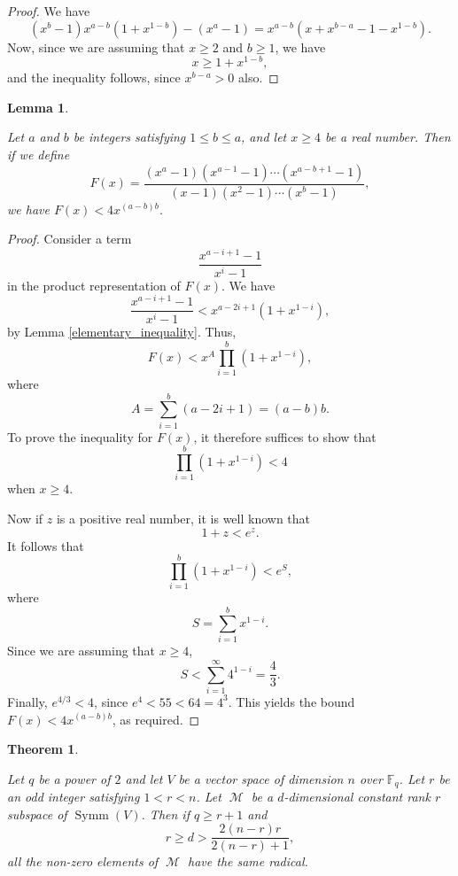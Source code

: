 \documentclass{amsart}
\DeclareMathOperator{\M}{\mathcal{M}}
\DeclareMathOperator{\Symm}{Symm}
\theoremstyle{plain}
\newtheorem{theorem}{Theorem}
\newtheorem{lemma}{Lemma}
\theoremstyle{definition}
\begin{document}
\begin{proof}
 
 We have
 \[
  (x^b-1)x^{a-b}(1+x^{1-b})-(x^a-1)=x^{a-b}(x+x^{b-a}-1-x^{1-b}).
 \]
 Now, since we are assuming that $x\geq 2$ and $b\geq 1$, we have
 \[
  x\geq 1+x^{1-b},
 \]
and the inequality follows, since $x^{b-a}>0$ also.

\end{proof}

\begin{lemma} \label{advanced_inequality}
 
 Let $a$ and $b$ be integers satisfying $1\leq b\leq a$, and let $x\geq 4$ be a real number. Then if we define
 \[
  F(x)=\frac{(x^a-1)(x^{a-1}-1)\cdots (x^{a-b+1}-1)}{(x-1)(x^2-1)\cdots (x^b-1)},
 \]
we have $F(x)<4x^{(a-b)b}$.
 
\end{lemma}

\begin{proof}
 Consider a term
 \[
  \frac{x^{a-i+1}-1}{x^i-1}
 \]
 in the product representation of $F(x)$. We have
 \[
  \frac{x^{a-i+1}-1}{x^i-1}<x^{a-2i+1}(1+x^{1-i}),
 \]
by Lemma \ref{elementary_inequality}. Thus,
\[
 F(x)<x^A\prod_{i=1}^b (1+x^{1-i}),
\]
where
\[
 A=\sum_{i=1}^b (a-2i+1)=(a-b)b.
\]
To prove the inequality for $F(x)$, it therefore suffices to show that
\[
 \prod_{i=1}^b (1+x^{1-i})<4
\]
when $x\geq 4$. 

Now if $z$ is a positive real number, it is well known that
\[
1+z< e^z.
\]
It follows that
\[
 \prod_{i=1}^b (1+x^{1-i})<e^S,
\]
where
\[
 S=\sum _{i=1}^b x^{1-i}.
\]
Since we are assuming that $x\geq 4$,
\[
 S<\sum_{i=1}^\infty 4^{1-i}=\frac{4}{3}.
\]
Finally, $e^{4/3}<4$, since $e^4<55<64=4^3$. This yields the bound $F(x)<4x^{(a-b)b}$, as required.

\end{proof}

\begin{theorem} \label{common_radicals_small_dimension}

Let $q$ be a power of $2$ and let $V$ be a vector space of dimension $n$ over $\mathbb{F}_q$. Let $r$ be an odd  integer
satisfying $1<r<n$. Let $\M$ be a $d$-dimensional constant rank $r$ subspace of $\Symm(V)$. Then if $q\geq r+1$ and
\[
 r\geq d> \frac{2(n-r)r}{2(n-r)+1},
\]
all the non-zero elements of $\M$ have the same radical.
 
\end{theorem}
\end{document}
